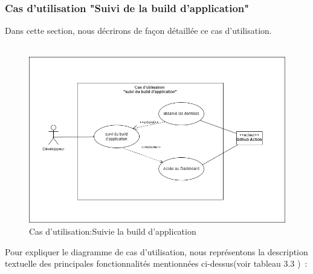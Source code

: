    \subsubsection{\Large Cas d’utilisation "Suivi de la build d'application"}
   \textsf{\selectfont{}
Dans cette section, nous décrirons de façon détaillée ce cas d'utilisation.\\\texttt{}\\[0.01cm]
}
\begin{figure}[H]
  \begin{center}
  
      \includegraphics[width=15cm]{UseCase2.drawio.png}

  \end{center}
  
  \caption{Cas d'utilisation:Suivie la build d'application }
\end{figure}
\textsf{\selectfont{}
Pour expliquer  le diagramme de cas d’utilisation, nous représentons la description textuelle des principales fonctionnalités mentionnées ci-dessus(voir tableau 3.3 ) : \\}
